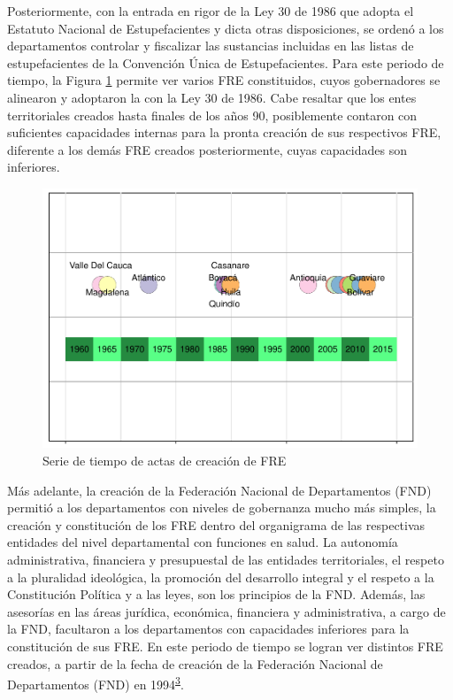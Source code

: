 \documentclass[
]{book}
\begin{document}
Posteriormente, con la entrada en rigor de la Ley 30 de 1986 que adopta el Estatuto Nacional de Estupefacientes y dicta otras disposiciones, se ordenó a los departamentos controlar y fiscalizar las sustancias incluidas en las listas de estupefacientes de la Convención Única de Estupefacientes. Para este periodo de tiempo, la Figura \ref{fig:serieTiempoCreacion} permite ver varios FRE constituidos, cuyos gobernadores se alinearon y adoptaron la con la Ley 30 de 1986. Cabe resaltar que los entes territoriales creados hasta finales de los años 90, posiblemente contaron con suficientes capacidades internas para la pronta creación de sus respectivos FRE, diferente a los demás FRE creados posteriormente, cuyas capacidades son inferiores.

\begin{figure}

{\centering \includegraphics[width=1\linewidth,height=0.5\textheight]{InformeFinal_files/figure-latex/serieTiempoCreacion-1} 

}

\caption{Serie de tiempo de actas de creación de FRE}\label{fig:serieTiempoCreacion}
\end{figure}

Más adelante, la creación de la Federación Nacional de Departamentos (FND) permitió a los departamentos con niveles de gobernanza mucho más simples, la creación y constitución de los FRE dentro del organigrama de las respectivas entidades del nivel departamental con funciones en salud. La autonomía administrativa, financiera y presupuestal de las entidades territoriales, el respeto a la pluralidad ideológica, la promoción del desarrollo integral y el respeto a la Constitución Política y a las leyes, son los principios de la FND. Además, las asesorías en las áreas jurídica, económica, financiera y administrativa, a cargo de la FND, facultaron a los departamentos con capacidades inferiores para la constitución de sus FRE. En este periodo de tiempo se logran ver distintos FRE creados, a partir de la fecha de creación de la Federación Nacional de Departamentos (FND) en 1994\textsuperscript{\protect\hyperlink{ref-FederacionNacionaldeDepartamentos2021}{3}}.
\end{document}
